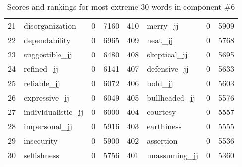 \begin{table}[tbp]
\begin{tabular}{| rlr@{.}l | rlr@{.}l |}
    21 & disorganization & 0 & 7160    &    410 & merry\_jj & 0 & 5909 \\
    22 & dependability & 0 & 6965    &    409 & neat\_jj & 0 & 5768 \\
    23 & suggestible\_jj & 0 & 6480    &    408 & skeptical\_jj & 0 & 5695 \\
    24 & refined\_jj & 0 & 6141    &    407 & defensive\_jj & 0 & 5633 \\
    25 & reliable\_jj & 0 & 6072    &    406 & bold\_jj & 0 & 5603 \\
    26 & expressive\_jj & 0 & 6049    &    405 & bullheaded\_jj & 0 & 5576 \\
    27 & individualistic\_jj & 0 & 6000    &    404 & courtesy & 0 & 5557 \\
    28 & impersonal\_jj & 0 & 5916    &    403 & earthiness & 0 & 5555 \\
    29 & insecurity & 0 & 5900    &    402 & assertion & 0 & 5536 \\
    30 & selfishness & 0 & 5756    &    401 & unassuming\_jj & 0 & 5360 \\
    \hline
    \end{tabular}
    \caption{Scores and rankings for most extreme 30 words in component \#6} 
\end{table}
\clearpage
